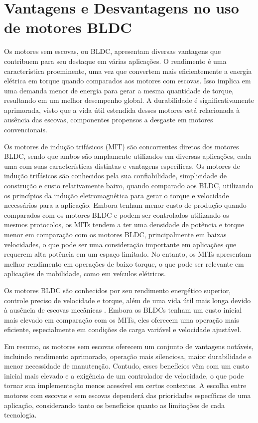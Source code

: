 \documentclass[12pt, a4paper, openright, oneside, brazilian]{abntex2}
\begin{document}
 \pagebreak 

 \section{Vantagens e Desvantagens no uso de motores BLDC} 
 Os motores sem escovas, ou BLDC, apresentam diversas vantagens que contribuem para seu destaque em várias aplicações. O rendimento é uma característica proeminente, uma vez que convertem mais eficientemente a energia elétrica em torque quando comparados aos motores com escovas. Isso implica em uma demanda menor de energia para gerar a mesma quantidade de torque, resultando em um melhor desempenho global. A durabilidade é significativamente aprimorada, visto que a vida útil estendida desses motores está relacionada à ausência das escovas, componentes propensos a desgaste em motores convencionais. 

 Os motores de indução trifásicos (MIT) são concorrentes diretos dos motores BLDC, sendo que ambos são amplamente utilizados em diversas aplicações, cada uma com suas características distintas e vantagens específicas. Os motores de indução trifásicos são conhecidos pela sua confiabilidade, simplicidade de construção e custo relativamente baixo, quando comparado aos BLDC, utilizando os princípios da indução eletromagnética para gerar o torque e velocidade necessários para a aplicação. Embora tenham menor custo de produção quando comparados com os motores BLDC e podem ser controlados utilizando os mesmos protocolos, os MITs tendem a ter uma densidade de potência e torque menor em comparação com os motores BLDC, principalmente em baixas velocidades, o que pode ser uma consideração importante em aplicações que requerem alta potência em um espaço limitado. No entanto, os MITs apresentam melhor rendimento em operações de baixo torque, o que pode ser relevante em aplicações de mobilidade, como em veículos elétricos. 

 Os motores BLDC são conhecidos por seu rendimento energético superior, controle preciso de velocidade e torque, além de uma vida útil mais longa devido à ausência de escovas mecânicas \cite{gieras2009permanent}. Embora os BLDCs tenham um custo inicial mais elevado em comparação com os MITs, eles oferecem uma operação mais eficiente, especialmente em condições de carga variável e velocidade ajustável. 

 Em resumo, os motores sem escovas oferecem um conjunto de vantagens notáveis, incluindo rendimento aprimorado, operação mais silenciosa, maior durabilidade e menor necessidade de manutenção. Contudo, esses benefícios vêm com um custo inicial mais elevado e a exigência de um controlador de velocidade, o que pode tornar sua implementação menos acessível em certos contextos. A escolha entre motores com escovas e sem escovas dependerá das prioridades específicas de uma aplicação, considerando tanto os benefícios quanto as limitações de cada tecnologia. 
\end{document}

